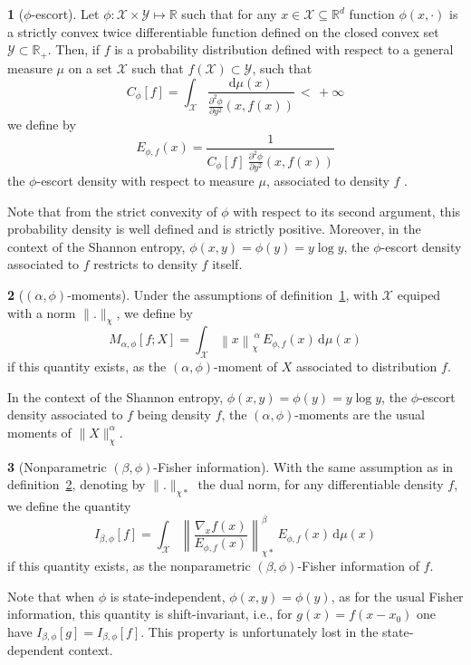 \documentclass[english,sort&compress]{elsarticle}
\theoremstyle{definition}
\newtheorem{defn}{\protect\definitionname}
\theoremstyle{plain}
\theoremstyle{plain}
\providecommand{\definitionname}{Definition}
\def\dmu{\mathrm{d}\mu}
\def\Rset{\mathbb{R}}
\def\X{\mathcal{X}}
\def\Y{\mathcal{Y}}
\begin{document}
\begin{defn}[$\phi$-escort]\label{def:phi-escort}
  Let $\phi: \X \times  \Y \mapsto \Rset$ such that for any  $x \in \X \subseteq
  \Rset^d$ function  $\phi(x,\cdot)$ is  a strictly convex  twice differentiable
  function defined on the closed convex  set $\Y \subset \Rset_+$.  Then, if $f$
  is a probability distribution defined  with respect to a general measure $\mu$
  on a set $\X$ such that $f(\X) \subset \Y$, such that
  \[
  C_\phi[f]    =     \int_\X    \frac{\dmu(x)}{\frac{\partial^2    \phi}{\partial
      y^2}(x,f(x))} \, < \, + \infty
  \]
  we define by
  \begin{equation}\label{eq:phi-escort}
    E_{\phi,f}(x) = \frac{1}{\displaystyle C_\phi[f] \: \frac{\partial^2
    \phi}{\partial y^2}(x,f(x))}
  \end{equation}
  the $\phi$-escort density with respect to measure $\mu$, associated to density
  $f$ .
\end{defn}
%
Note  that from  the  strict convexity  of  $\phi$ with  respect  to its  second
argument,   this  probability   density  is   well  defined   and   is  strictly
positive. Moreover, in the context  of the Shannon entropy, $\phi(x,y) = \phi(y)
= y  \log y$, the $\phi$-escort  density associated to $f$  restricts to density
$f$ itself.

\begin{defn}[$(\alpha,\phi)$-moments]\label{def:phi-moment}
  Under  the assumptions of  definition~\ref{def:phi-escort}, with  $\X$ equiped
  with a norm $\|.\|_\chi$, we define by
  \begin{equation}\label{eq:phi-moment}
  M_{\alpha,\phi}[f;X] = \int_\X \left\| x \right\|_\chi^{\: \alpha} \,
  E_{\phi,f}(x) \, \dmu(x)
  \end{equation}
  if this  quantity exists, as  the $(\alpha,\phi)$-moment of $X$  associated to
  distribution $f$.
\end{defn}
%
In the  context of the Shannon  entropy, $\phi(x,y) =  \phi(y) = y \log  y$, the
$\phi$-escort   density    associated   to   $f$   being    density   $f$,   the
$(\alpha,\phi)$-moments are the usual moments of $\|X\|_\chi^\alpha$.

\begin{defn}[Nonparametric $(\beta,\phi)$-Fisher information]\label{def:np-phi-Fisher}
  With the  same assumption  as in definition~\ref{def:phi-moment},  denoting by
  $\|.\|_{\chi*}$ the dual  norm, for any differentiable density  $f$, we define
  the quantity
  \begin{equation}\label{eq:np-phi-Fisher}
    I_{\beta,\phi}[f] = \int_\X \left\| \frac{\nabla_x f(x)}{E_{\phi,f}(x)}
    \right\|_{\chi*}^\beta \, E_{\phi,f}(x) \, \dmu(x)
  \end{equation}
  if   this  quantity   exists,  as   the   nonparametric  $(\beta,\phi)$-Fisher
  information of $f$.
\end{defn}
%
Note that  when $\phi$ is state-independent,  $\phi(x,y) = \phi(y)$,  as for the
usual Fisher information,  this quantity is shift-invariant, i.e.,  for $g(x) =
f(x-x_0)$  one have  $I_{\beta,\phi}[g] =  I_{\beta,\phi}[f]$. This  property is
unfortunately lost in the state-dependent context.
\end{document}
